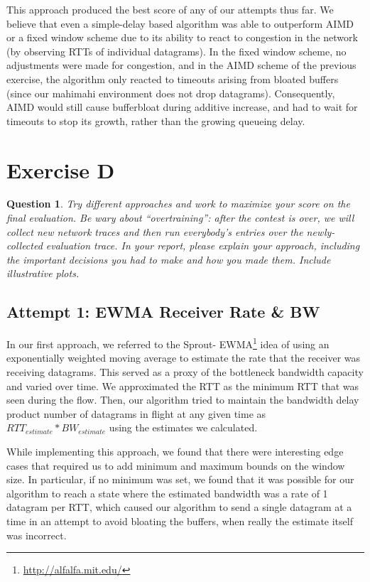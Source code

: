 \documentclass[twoside]{article}
\newtheorem{question}[theorem]{Question}
\begin{document}
This approach produced the best score of any of our attempts thus far.
We believe that even a simple-delay based algorithm was able to outperform
AIMD or a fixed window scheme due to its ability to react to congestion in the
network (by observing RTTs of individual datagrams). In the fixed window scheme,
no adjustments were made for congestion, and in the AIMD scheme of the previous
exercise, the algorithm only reacted to timeouts arising from bloated buffers
(since our mahimahi environment does not drop datagrams). Consequently, AIMD
would still cause bufferbloat during additive increase, and had to wait for
timeouts to stop its growth, rather than the growing queueing delay.

\vfill
\pagebreak

\section*{Exercise D}
\begin{question}
  Try different approaches and work to maximize your score on the final
  evaluation. Be wary about ``overtraining'': after the contest is over, we
  will collect new network traces and then run everybody's entries over the
  newly-collected evaluation trace. In your report, please explain your
  approach, including the important decisions you had to make and how you made
  them. Include illustrative plots.
\end{question}

\subsection*{Attempt 1: EWMA Receiver Rate \& BW}
In our first approach, we referred to the Sprout-
EWMA\footnote{\url{http://alfalfa.mit.edu/}} idea of using an exponentially
weighted moving average to estimate the rate that the receiver was receiving
datagrams. This served as a proxy of the bottleneck bandwidth
capacity and varied over time. We approximated the RTT as the minimum
RTT that was seen during the flow.
Then, our algorithm tried to maintain the bandwidth delay product number of
datagrams in flight at any given time as $RTT_{estimate} * BW_{estimate}$ using
the estimates we calculated.

While implementing this approach, we found that there were interesting edge
cases that required us to add minimum and maximum bounds on the window size.
In particular, if no minimum was set, we found that it was possible for our
algorithm to reach a state where the estimated bandwidth was a rate of 1 datagram
per RTT, which caused our algorithm to send a single datagram at a time in an
attempt to avoid bloating the buffers, when really the estimate itself
was incorrect.
\end{document}
